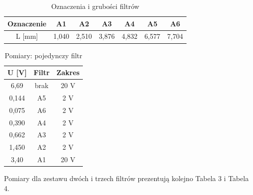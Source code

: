 \documentclass[10pt,a4paper]{article}
\begin{document}
\begin{table}[h!]
\centering
\caption{Oznaczenia i grubości filtrów}
\label{t1}
\begin{tabular}{|c|c|c|c|c|c|c|}
\hline
Oznaczenie & A1    & A2    & A3    & A4    & A5    & A6    \\ \hline
L [mm]     & 1,040 & 2,510 & 3,876 & 4,832 & 6,577 & 7,704 \\ \hline
\end{tabular}
\end{table}

\begin{table}[h!]
\centering
\caption{Pomiary: pojedynczy filtr}
\label{t2}
\begin{tabular}{|c|c|c|}
\hline
U [V] & Filtr & Zakres \\ \hline
6,69  & brak     & 20 V   \\ \hline
0,144 & A5    & 2 V    \\ \hline
0,075 & A6    & 2 V    \\ \hline
0,390 & A4    & 2 V    \\ \hline
0,662 & A3    & 2 V    \\ \hline
1,450 & A2    & 2 V    \\ \hline
3,40  & A1    & 20 V   \\ \hline
\end{tabular}
\end{table}


Pomiary dla zestawu dwóch i trzech filtrów prezentują kolejno Tabela 3 i Tabela 4. 
\end{document}
